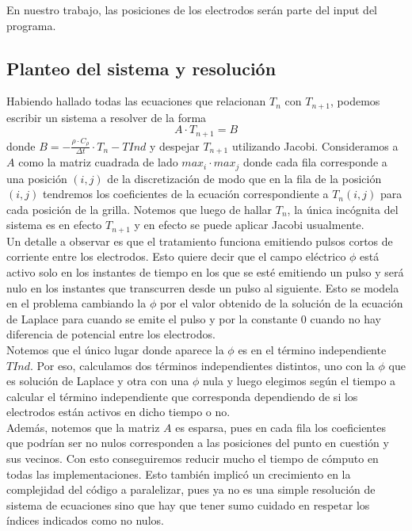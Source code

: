 \documentclass[a4paper]{article}
\begin{document}
En nuestro trabajo, las posiciones de los electrodos serán parte del input del programa.

\subsection{Planteo del sistema y resolución}

Habiendo hallado todas las ecuaciones que relacionan $T_n$ con $T_{n+1}$, 
podemos escribir un sistema a resolver de la forma $$A \cdot T_{n+1} = B$$ donde 
$B = -\frac{\rho \cdot C_\rho}{\Delta t} \cdot T_n - TInd$ y 
despejar $T_{n+1}$ utilizando Jacobi. Consideramos a $A$ como la matriz 
cuadrada de lado $max_i \cdot max_j$ donde cada fila corresponde a 
una posición $(i, j)$ de la discretización de modo que en la fila de la 
posición $(i, j)$ tendremos los coeficientes de la ecuación correspondiente 
a $T_n(i,j)$ para cada posición de la grilla. Notemos que luego de hallar $T_n$, 
la única incógnita del sistema es en efecto $T_{n+1}$ y en efecto se puede 
aplicar Jacobi usualmente.\\

Un detalle a observar es que el tratamiento funciona emitiendo pulsos 
cortos de corriente entre los electrodos. Esto quiere decir que el 
campo eléctrico $\phi$ está activo solo en los instantes de tiempo en 
los que se esté emitiendo un pulso y será nulo en los instantes que 
transcurren desde un pulso al siguiente. Esto se modela en el problema 
cambiando la $\phi$ por el valor obtenido de la solución de la ecuación 
de Laplace para cuando se emite el pulso y por la constante $0$ cuando 
no hay diferencia de potencial entre los electrodos.\\

Notemos que el único lugar donde aparece la $\phi$ es en el término 
independiente $TInd$. Por eso, calculamos dos términos independientes 
distintos, uno con la $\phi$ que es solución de Laplace y otra con 
una $\phi$ nula y luego elegimos según el tiempo a calcular el término 
independiente que corresponda dependiendo de si los electrodos están 
activos en dicho tiempo o no. \\

Además, notemos que la matriz $A$ es esparsa, pues en cada fila los coeficientes 
que podrían ser no nulos corresponden a las posiciones del punto en 
cuestión y sus vecinos. Con esto conseguiremos reducir mucho el tiempo 
de cómputo en todas las implementaciones. Esto también implicó un crecimiento
en la complejidad del código a paralelizar, pues ya no es una simple resolución
de sistema de ecuaciones sino que hay que tener sumo cuidado en respetar
los índices indicados como no nulos. \\
\end{document}
